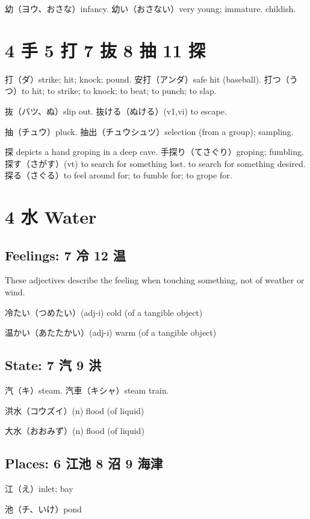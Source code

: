 幼（ヨウ、おさな）infancy.
幼い（おさない）very young; immature. childish.

\section{4 手 5 打 7 抜 8 抽 11 探}

打（ダ）strike; hit; knock; pound.
安打（アンダ）safe hit (baseball).
打つ（うつ）to hit; to strike; to knock; to beat; to punch; to slap.

抜（バツ、ぬ）slip out.
抜ける（ぬける）(v1,vi) to escape.

抽（チュウ）pluck.
抽出（チュウシュツ）selection (from a group); sampling.

探 depicts a hand groping in a deep cave.
手探り（てさぐり）groping; fumbling.
探す（さがす）(vt)
to search for something lost.
to search for something desired.
探る（さぐる）to feel around for; to fumble for; to grope for.

\section{4 水 Water}

\subsection{Feelings: 7 冷 12 温}

These adjectives describe the feeling when
touching something, not of weather or wind.

冷たい（つめたい）(adj-i) cold (of a tangible object)

温かい（あたたかい）(adj-i) warm (of a tangible object)

\subsection{State: 7 汽 9 洪}

汽（キ）steam.
汽車（キシャ）steam train.

洪水（コウズイ）(n) flood (of liquid)

大水（おおみず）(n) flood (of liquid)

\subsection{Places: 6 江池 8 沼 9 海津}

江（え）inlet; bay

池（チ、いけ）pond

